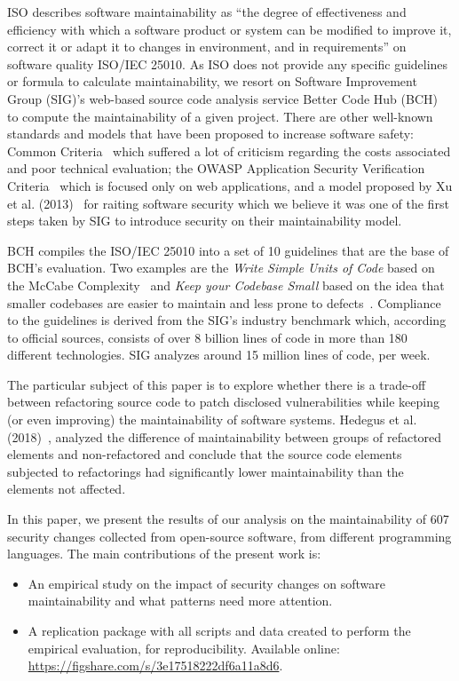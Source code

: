 \documentclass[10pt,conference]{IEEEtran}
\begin{document}
ISO describes software maintainability as ``the degree of effectiveness and
efficiency with which a software product or system can be modified to improve
it, correct it or adapt it to changes in environment, and in requirements'' on
software quality ISO/IEC 25010. As ISO does not provide any specific guidelines or
formula to calculate maintainability, we resort on Software Improvement
Group (SIG)'s web-based source code analysis service Better Code Hub
(BCH)~\cite{Visser:2016:OREILLY} to compute the maintainability of a given
project. There are other well-known standards and models that have been proposed to increase software safety:
Common Criteria~\cite{common:2009} which suffered a lot of criticism regarding the
costs associated and poor technical evaluation; the OWASP
Application Security Verification Criteria~\cite{oswap:2009} which is focused only
on web applications, and a model proposed by Xu et al. (2013)~\cite{6616351} for
raiting software security which we believe it was one of the first steps taken
by SIG to introduce security on their maintainability model.

BCH compiles the ISO/IEC 25010 into a set of 10 guidelines that are the
base of BCH's evaluation. Two examples are the
\emph{Write Simple Units of Code} based on the McCabe Complexity~\cite{1702388}
and \emph{Keep your Codebase Small} based on the idea that smaller codebases are
easier to maintain and less prone to defects~\cite{Visser:2016:OREILLY}. Compliance to the guidelines is derived from the SIG's
industry benchmark which, according to official sources, consists of over 8
billion lines of code in more than 180 different technologies. SIG analyzes
around 15 million lines of code, per week.

The particular subject of this paper is to explore whether there is a trade-off
between refactoring source code to patch disclosed vulnerabilities while keeping
(or even improving) the maintainability of software systems. Hedegus et al. (2018)~\cite{HEGEDUS2018313},
analyzed the difference of maintainability between
groups of refactored elements and non-refactored and conclude that the source
code elements subjected to refactorings had significantly lower maintainability
than the elements not affected.

In this paper, we present the results of our analysis on the maintainability of
607 security changes collected from open-source software, from different
programming languages. The main contributions of the present work is:
\begin{itemize}
	\item An empirical study on the impact of security changes on software
	maintainability and what patterns need more attention.

	\item A replication package with all scripts and data created to perform the
	empirical evaluation, for reproducibility. Available online:
  \url{https://figshare.com/s/3e17518222df6a11a8d6}.

\end{itemize}
\end{document}
